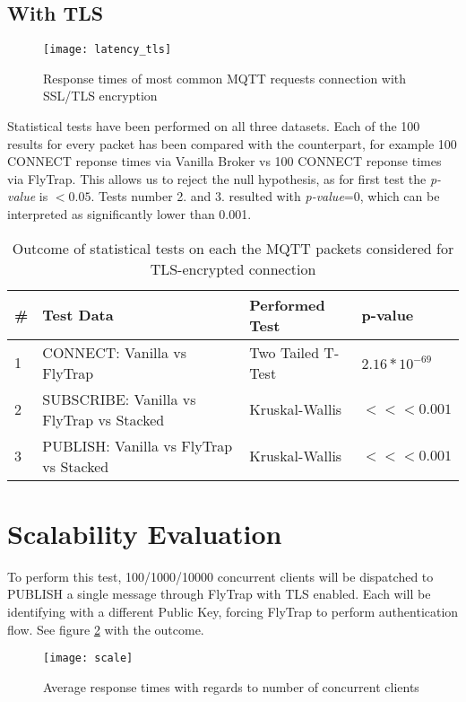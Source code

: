 \subsection{With TLS}
\begin{figure}[h]
    \centering
    \texttt{[image: latency\_tls]}
    \caption{Response times of most common MQTT requests connection with SSL/TLS encryption}
    \label{fig:latency_tls}
\end{figure}

Statistical tests have been performed on all three datasets. Each of the 100 results for every packet has been compared with the counterpart, for example 100 CONNECT reponse times via Vanilla Broker vs 100 CONNECT reponse times via FlyTrap. This allows us to reject the null hypothesis, as for first test the \textit{p-value} is $<0.05$. Tests number 2. and 3. resulted with \textit{p-value}=0, which can be interpreted as significantly lower than 0.001.

\begin{table}[]
\centering
\begin{tabular}{|l|l|l|l|}
\hline
\textbf{\#} & \textbf{Test Data}                       & \textbf{Performed Test} & \textbf{p-value}                      \\ \hline
1           & CONNECT: Vanilla vs FlyTrap              & Two Tailed T-Test       & $2.16*10^{-69}$                    \\ \hline
2           & SUBSCRIBE: Vanilla vs FlyTrap vs Stacked & Kruskal-Wallis          & $<<< 0.001$ \\ \hline
3           & PUBLISH: Vanilla vs FlyTrap vs Stacked & Kruskal-Wallis          & $<<< 0.001$ \\ \hline
\end{tabular}
\caption{Outcome of statistical tests on each the MQTT packets considered for TLS-encrypted connection}
\label{tab:ttest-tls}
\end{table}

\section{Scalability Evaluation}
To perform this test, 100/1000/10000 concurrent clients will be dispatched to PUBLISH a single message through FlyTrap with TLS enabled. Each will be identifying with a different Public Key, forcing FlyTrap to perform authentication flow. See figure \ref{fig:scale} with the outcome. 
\begin{figure}[h]
    \centering
    \texttt{[image: scale]}
    \caption{Average response times with regards to number of concurrent clients}
    \label{fig:scale}
\end{figure}

